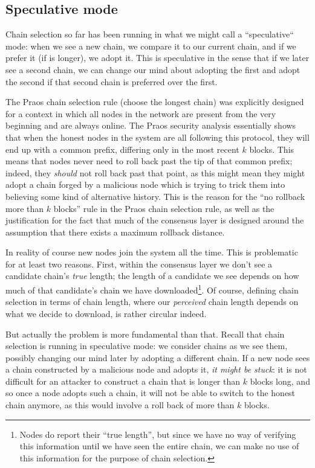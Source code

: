 \subsection{Speculative mode}

Chain selection so far has been running in what we might call a ``speculative``
mode: when we see a new chain, we compare it to our current chain, and if we
prefer it (if is longer), we adopt it. This is speculative in the sense that
if we later see a second chain, we can change our mind about adopting the
first and adopt the second if that second chain is preferred over the first.

The Praos chain selection rule (choose the longest chain) was explicitly
designed for a context in which all nodes in the network are present from the
very beginning and are always online. The Praos security analysis
\cite{cryptoeprint:2017:573} essentially shows that when the honest nodes in the
system are all following this protocol, they will end up with a common prefix,
differing only in the most recent $k$ blocks. This means that nodes never need
to roll back past the tip of that common prefix; indeed, they \emph{should} not
roll back past that point, as this might mean they might adopt a chain forged by
a malicious node which is trying to trick them into believing some kind of
alternative history. This is the reason for the ``no rollback more than $k$
blocks'' rule in the Praos chain selection rule, as well as the justification
for the fact that much of the consensus layer is designed around the assumption
that there exists a maximum rollback distance.

In reality of course new nodes join the system all the time. This is problematic
for at least two reasons. First, within the consensus layer we don't see a
candidate chain's \emph{true} length; the length of a candidate we see depends
on how much of that candidate's chain we have downloaded\footnote{Nodes do
report their ``true length'', but since we have no way of verifying this
information until we have seen the entire chain, we can make no use of this
information for the purpose of chain selection.}. Of course, defining chain
selection in terms of chain length, where our \emph{perceived} chain length
depends on what we decide to download, is rather circular indeed.

But actually the problem is more fundamental than that. Recall that chain
selection is running in speculative mode: we consider chains as we see them,
possibly changing our mind later by adopting a different chain. If a new node
sees a chain constructed by a malicious node and adopts it, \emph{it might be
stuck}: it is not difficult for an attacker to construct a chain that is longer
than $k$ blocks long, and so once a node adopts such a chain, it will not be
able to switch to the honest chain anymore, as this would involve a roll back
of more than $k$ blocks.

